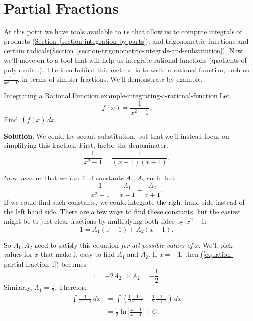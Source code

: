 \documentclass[10pt,]{book}
\numberwithin{equation}{section}
\begin{document}
\section[{Partial Fractions}]{Partial Fractions}\label{section-partial-fractions}
\hypertarget{p-549}{}%
At this point we have tools available to us that allow us to compute integrals of products (\hyperref[section-integration-by-parts]{Section~\ref{section-integration-by-parts}}), and trigonometric functions and certain radicals(\hyperref[section-trigonometric-integrals-and-substitution]{Section~\ref{section-trigonometric-integrals-and-substitution}}). Now we'll move on to a tool that will help us integrate rational functions (quotients of polynomials). The idea behind this method is to write a rational function, such as \(\frac{1}{x^{2} - 1}\), in terms of simpler fractions. We'll demonstrate by example.%
\begin{example}{Integrating a Rational Function.}{example-integrating-a-rational-function}%
\hypertarget{p-550}{}%
Let%
\begin{equation*}
f(x) = \frac{1}{x^{2} - 1}.
\end{equation*}
Find \(\int f(x)\,dx\).%
\par\smallskip%
\noindent\textbf{Solution}.\hypertarget{solution-121}{}\quad%
\hypertarget{p-551}{}%
We could try secant substitution, but that we'll instead focus on simplifying this fraction. First, factor the denominator:%
\begin{equation*}
\frac{1}{x^{2} - 1} = \frac{1}{(x-1)(x+1)}.
\end{equation*}
%
\par
\hypertarget{p-552}{}%
Now, assume that we can find constants \(A_{1}, A_{2}\) such that%
\begin{equation*}
\frac{1}{x^{2} - 1} = \frac{A_{1}}{x-1} + \frac{A_{2}}{x + 1}.
\end{equation*}
If we could find such constants, we could integrate the right hand side instead of the left hand side. There are a few ways to find these constants, but the easiest might be to just clear fractions by multiplying both sides by \(x^{2} - 1\):%
\begin{equation}
1 = A_{1}(x + 1) + A_{2}(x - 1).\label{equation-partial-fraction-1}
\end{equation}
%
\par
\hypertarget{p-553}{}%
So \(A_{1},A_{2}\) need to satisfy this equation \emph{for all possible values of} \(x\). We'll pick values for \(x\) that make it easy to find \(A_{1}\) and \(A_{2}\). If \(x = -1\), then \hyperref[equation-partial-fraction-1]{(\ref{equation-partial-fraction-1})} becomes%
\begin{equation*}
1 = -2A_{2} \Rightarrow A_{2} = -\frac{1}{2}.
\end{equation*}
Similarly, \(A_{1} = \frac{1}{2}.\) Therefore%
%
\begin{align*}
\int\frac{1}{x^{2}-1}\,dx & = \int\left(\frac{1}{2}\frac{1}{x-1} - \frac{1}{2}\frac{1}{x+1}\right)\,dx \\
& = \frac{1}{2}\ln\left|\frac{x-1}{x+1}\right| + C. 
\end{align*}
\end{example}
\end{document}
